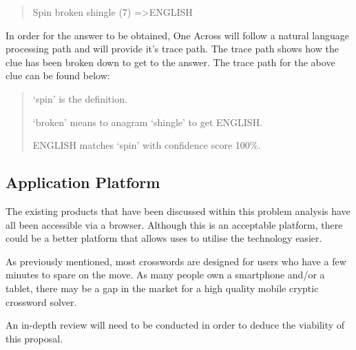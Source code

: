 \begin{quote}
Spin broken shingle (7) =\textgreater  ENGLISH
\end{quote}

In order for the answer to be obtained, One Across will follow a natural 
language processing path and will provide it's trace path. The trace path shows
how the clue has been broken down to get to the answer. The trace path for the 
above clue can be found below:

\begin{quote}
`spin' is the definition.

`broken' means to anagram `shingle' to get ENGLISH.

ENGLISH matches `spin' with confidence score 100\%.
\end{quote}


\subsection{Application Platform}

The existing products that have been discussed within this problem analysis 
have all been accessible via a browser. Although this is an acceptable 
platform, there could be a better platform that allows uses to utilise the 
technology easier.

As previously mentioned, most crosswords are designed for users who have a few 
minutes to spare on the move. As many people own a smartphone and/or a tablet, 
there may be a gap in the market for a high quality mobile cryptic crossword 
solver.

An in-depth review will need to be conducted in order to deduce the viability 
of this proposal.
